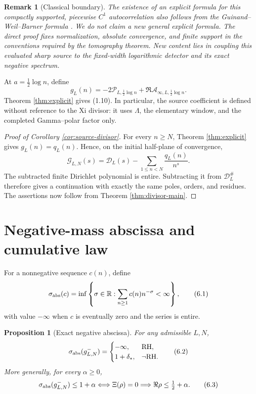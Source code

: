\documentclass[11pt]{article}
\newtheorem{proposition}[theorem]{Proposition}
\newtheorem{remark}[theorem]{Remark}
\newcommand{\R}{\mathbb R}
\newcommand{\cP}{\mathcal P}
\newcommand{\cA}{\mathcal A}
\begin{document}
\begin{remark}[Classical boundary]
The existence of an explicit formula for this compactly supported, piecewise \(C^1\)
autocorrelation also follows from the Guinand--Weil--Barner formula
\cite{Guinand1949,Barner1981}.  We do not claim a new general explicit formula.  The direct proof
fixes normalization, absolute convergence, and finite support in the conventions required by the
tomography theorem.  New content lies in coupling this evaluated sharp source to the fixed-width
logarithmic detector and its exact negative spectrum.
\end{remark}

At \(a=\frac12\log n\), define
\[
 g_L(n)=-2\cP_{L,\frac12\log n}
 +\Re\cA_{\infty,L,\frac12\log n}.
\tag{5.14}
\]
Theorem \ref{thm:explicit} gives (1.10).  In particular, the source coefficient is defined
without reference to the Xi divisor: it uses \(\Lambda\), the elementary window, and the
completed Gamma--polar factor only.

\begin{proof}[Proof of Corollary \ref{cor:source-divisor}]
For every \(n\ge N\), Theorem \ref{thm:explicit} gives \(g_L(n)=q_L(n)\).  Hence, on the initial
half-plane of convergence,
\[
 \mathcal G_{L,N}(s)
 =\mathcal D_L(s)-\sum_{1\le n<N}\frac{q_L(n)}{n^s}.
\]
The subtracted finite Dirichlet polynomial is entire.  Subtracting it from
\(\mathcal D_L^\#\) therefore gives a continuation with exactly the same poles, orders, and
residues.  The assertions now follow from Theorem \ref{thm:divisor-main}.
\end{proof}

\section{Negative-mass abscissa and cumulative law}\label{sec:mass}

For a nonnegative sequence \(c(n)\), define
\[
 \sigma_{\rm abs}(c)=
 \inf\left\{\sigma\in\R:
   \sum_{n\ge1}c(n)n^{-\sigma}<\infty\right\},
\tag{6.1}
\]
with value \(-\infty\) when \(c\) is eventually zero and the series is entire.

\begin{proposition}[Exact negative abscissa]\label{prop:abscissa}
For any admissible \(L,N\),
\[
 \sigma_{\rm abs}(g^-_{L,N})=
 \begin{cases}
 -\infty,&\mathrm{RH},\\
 1+\delta_*,&\neg\mathrm{RH}.
 \end{cases}
\tag{6.2}
\]
More generally, for every \(\alpha\ge0\),
\[
 \sigma_{\rm abs}(g^-_{L,N})\le1+\alpha
 \Longleftrightarrow
 \Xi(\rho)=0\Longrightarrow\Re\rho\le\tfrac12+\alpha.
\tag{6.3}
\]
\end{proposition}
\end{document}

